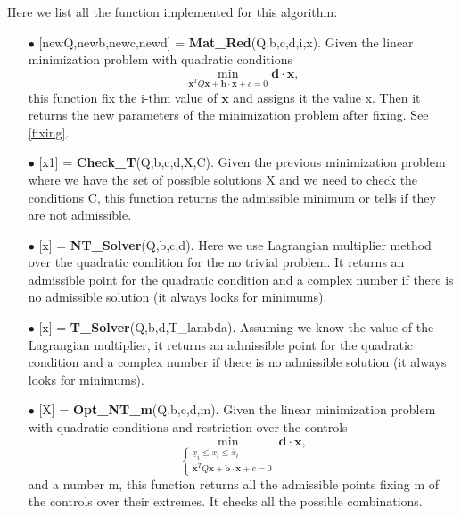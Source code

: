 \documentclass[12pt]{article}
\theoremstyle{definition}
\theoremstyle{remark}
\begin{document}
Here we list all the function implemented for this algorithm:
\begin{enumerate}

\item[$\bullet$] [newQ,newb,newc,newd] = \textbf{Mat\_Red}(Q,b,c,d,i,x). Given the linear minimization problem with quadratic conditions
\begin{equation*}
\min_{\bm{x}^TQ\bm{x}+\bm{b}\cdot\bm{x}+c=0}\bm{d}\cdot\bm{x},
\end{equation*}
this function fix the i-thm value of $\bm{x}$ and assigns it the value x. Then it returns the new parameters of the minimization problem after fixing. See \ref{fixing}.

\item[$\bullet$] [x1] = \textbf{Check\_T}(Q,b,c,d,X,C). Given the previous minimization problem where we have the set of possible solutions X and we need to check the conditions C, this function returns the admissible minimum or tells if they are not admissible.

\item[$\bullet$] [x] = \textbf{NT\_Solver}(Q,b,c,d). Here we use Lagrangian multiplier method over the quadratic condition for the no trivial problem. It returns an admissible point for the quadratic condition and a complex number if there is no admissible solution (it always looks for minimums).

\item[$\bullet$] [x] = \textbf{T\_Solver}(Q,b,d,T\_lambda). Assuming we know the value of the Lagrangian multiplier, it returns an admissible point for the quadratic condition and a complex number if there is no admissible solution (it always looks for minimums).

\item[$\bullet$] [X] = \textbf{Opt\_NT\_m}(Q,b,c,d,m). Given the linear minimization problem with quadratic conditions and restriction over the controls
\begin{equation*}
\min_{\begin{cases}
\underline{x}_i\leq x_i\leq\overline{x}_i\\
\bm{x}^TQ\bm{x}+\bm{b}\cdot\bm{x}+c=0
\end{cases}} \bm{d}\cdot\bm{x},
\end{equation*}
and a number m, this function returns all the admissible points fixing m of the controls over their extremes. It checks all the possible combinations.


\end{enumerate}
\end{document}
